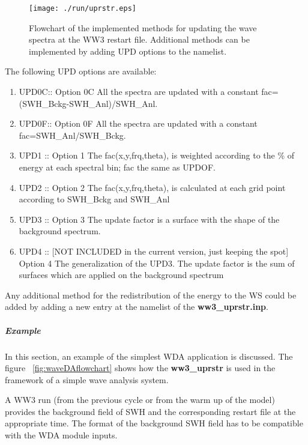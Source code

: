 \begin{figure} \begin{center}
\texttt{[image: ./run/uprstr.eps]}
\caption{Flowchart of the implemented methods for updating the wave spectra at the WW3 
restart file. Additional methods can be implemented by adding UPD options to the namelist.}
\label{fig:uprstrflowchart} \botline
\end{center}
\end{figure}

The following UPD options are available:
\begin{enumerate} 
   \item UPD0C:: Option 0C  All the spectra are updated with a constant 
      fac=(SWH\_Bckg-SWH\_Anl)/SWH\_Anl.
   \item UPD0F:: Option 0F  All the spectra are updated with a constant 
      fac=SWH\_Anl/SWH\_Bckg. 
   \item UPD1 :: Option 1   The fac(x,y,frq,theta), is weighted according to
      the \% of energy at each spectral bin; fac the same as UPDOF.
   \item UPD2 :: Option 2   The fac(x,y,frq,theta), is calculated at 
         each grid point according to SWH\_Bckg and SWH\_Anl
   \item UPD3 :: Option 3   The update factor is a surface with the shape of 
      the background spectrum. 
   \item UPD4 :: [NOT INCLUDED in the current version, just keeping the spot]
      Option 4  The generalization of the UPD3. The update factor is the sum of surfaces 
      which are applied on the background spectrum 
\end{enumerate}

Any additional method for the redistribution of the energy to the WS could be added 
by adding a new entry at the namelist of the \textbf{ww3\_uprstr.inp}.

\subparagraph{Example \newline}
In this section, an example of the simplest WDA application is discussed.
The figure ~\ref{fig:waveDAflowchart} shows how the \textbf{ww3\_uprstr} 
is used in the framework of a simple wave analysis system. \newline

A WW3 run (from the previous cycle or from the warm up of the model) provides the
background field of SWH and the corresponding restart file at the appropriate time. 
The format of the background SWH field has to be compatible with the WDA module inputs.

